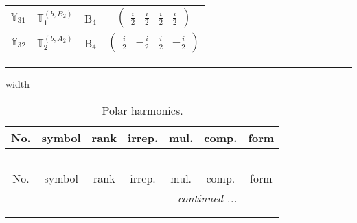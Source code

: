 \documentclass[fleqn,10pt,landscape]{article}
\begin{document}
\begin{itemize}
\begin{center}
\begin{longtable}{c|c|c|c}
$ \mathbb{Y}_{31} $ & $\mathbb{T}_{1}^{(b,B_{2})}$ & B$_{4}$ & $\begin{pmatrix} \frac{i}{2} & \frac{i}{2} & \frac{i}{2} & \frac{i}{2} \end{pmatrix}$ \\
$ \mathbb{Y}_{32} $ & $\mathbb{T}_{2}^{(b,A_{2})}$ & B$_{4}$ & $\begin{pmatrix} \frac{i}{2} & - \frac{i}{2} & \frac{i}{2} & - \frac{i}{2} \end{pmatrix}$ \\
\end{longtable}
\end{center}

 \hfil \hrule height 1mm width \textwidth \hfil

\begin{center}
\renewcommand{\arraystretch}{1.3}
\begin{longtable}{ccccccc}
\caption{Polar harmonics.}
 \\
 \hline \hline
No. & symbol & rank & irrep. & mul. & comp. & form \\ \hline \endfirsthead

\multicolumn{6}{l}{\tablename\ \thetable{}} \\
 \hline \hline
No. & symbol & rank & irrep. & mul. & comp. & form \\ \hline \endhead

 \hline \hline
\multicolumn{6}{r}{\footnotesize\it continued ...} \\ \endfoot

 \hline \hline
\multicolumn{6}{r}{} \\ \endlastfoot


\end{longtable}
\end{center}
\end{itemize}
\end{document}
